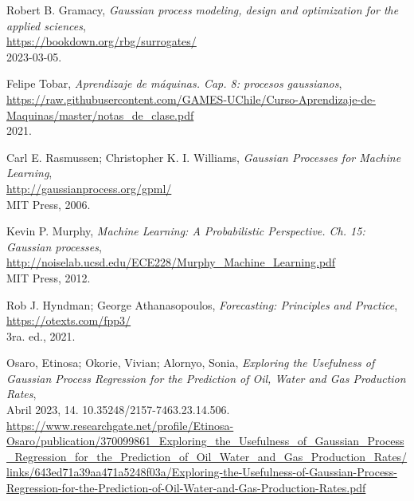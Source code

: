 \documentclass[a4paper]{article}
\begin{document}
\begin{thebibliography}{9}
	
	Robert B. Gramacy, \textit{Gaussian process modeling, design and optimization for the applied sciences},\\
	\url{https://bookdown.org/rbg/surrogates/}\\
	2023-03-05.
	
	Felipe Tobar, \textit{Aprendizaje de máquinas. Cap. 8: procesos gaussianos},\\
	\url{https://raw.githubusercontent.com/GAMES-UChile/Curso-Aprendizaje-de-Maquinas/master/notas_de_clase.pdf}\\
	2021.
	
	Carl E. Rasmussen; Christopher K. I. Williams, \textit{Gaussian Processes for Machine Learning},\\
	\url{http://gaussianprocess.org/gpml/}\\
	MIT Press, 2006.
	
	Kevin P. Murphy, \textit{Machine Learning: A Probabilistic Perspective. Ch. 15: Gaussian processes},\\
	\url{http://noiselab.ucsd.edu/ECE228/Murphy_Machine_Learning.pdf}\\
	MIT Press, 2012.
	
	Rob J. Hyndman; George Athanasopoulos, \textit{Forecasting: Principles and Practice},\\
	\url{https://otexts.com/fpp3/}\\
	3ra. ed., 2021.
	
	Osaro, Etinosa; Okorie, Vivian; Alornyo, Sonia, \textit{Exploring the Usefulness of Gaussian Process Regression for the Prediction of Oil, Water and Gas Production Rates},\\
	Abril 2023, 14. 10.35248/2157-7463.23.14.506.\\
	\url{https://www.researchgate.net/profile/Etinosa-Osaro/publication/370099861_Exploring_the_Usefulness_of_Gaussian_Process_Regression_for_the_Prediction_of_Oil_Water_and_Gas_Production_Rates/links/643ed71a39aa471a5248f03a/Exploring-the-Usefulness-of-Gaussian-Process-Regression-for-the-Prediction-of-Oil-Water-and-Gas-Production-Rates.pdf}
	
\end{thebibliography}
\end{document}
